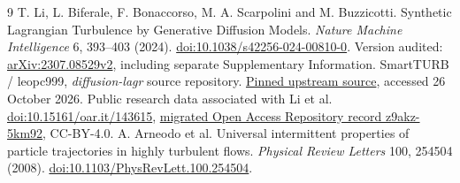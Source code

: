 \documentclass[10pt,a4paper]{article}
\begin{document}
\begin{thebibliography}{9}
 T. Li, L. Biferale, F. Bonaccorso, M. A. Scarpolini and M. Buzzicotti.
Synthetic Lagrangian Turbulence by Generative Diffusion Models.
\emph{Nature Machine Intelligence} 6, 393--403 (2024).
\href{https://doi.org/10.1038/s42256-024-00810-0}{doi:10.1038/s42256-024-00810-0}.
Version audited: \href{https://arxiv.org/abs/2307.08529v2}{arXiv:2307.08529v2}, including separate Supplementary Information.
 SmartTURB / leopc999, \emph{diffusion-lagr} source repository.
\href{https://github.com/leopc999/diffusion-lagr/tree/77da6cdc67775aa45af6c4148068f00a75e54c41}{Pinned upstream source}, accessed 26 October 2026.
 Public research data associated with Li et al.
\href{https://doi.org/10.15161/oar.it/143615}{doi:10.15161/oar.it/143615},
\href{https://www.openaccessrepository.it/records/z9akz-5km92}{migrated Open Access Repository record z9akz-5km92}, CC-BY-4.0.
 A. Arneodo et al. Universal intermittent properties of particle trajectories in highly turbulent flows.
\emph{Physical Review Letters} 100, 254504 (2008).
\href{https://doi.org/10.1103/PhysRevLett.100.254504}{doi:10.1103/PhysRevLett.100.254504}.
\end{thebibliography}
\end{document}
